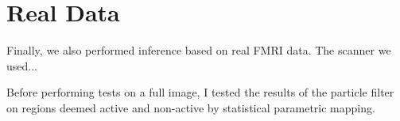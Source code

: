 \section{Real Data}
Finally, we also performed inference based on real FMRI data. The scanner we used...

Before performing tests on a full image, I tested the results of the particle filter
on regions deemed active and non-active by statistical parametric mapping. 


